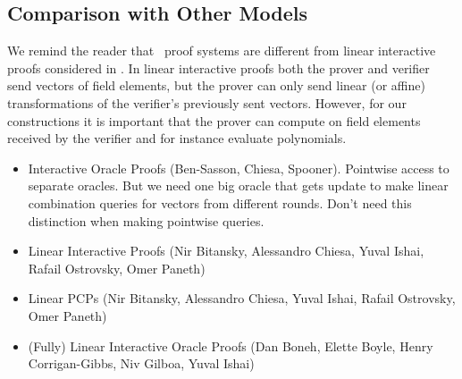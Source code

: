 \subsection{Comparison with Other Models}

We remind the reader that \ILC\ proof systems are different from linear interactive proofs considered in \cite{BitanskyCIPO13}. In linear interactive proofs both the prover and verifier send vectors of field elements, but the prover can only send linear (or affine) transformations of the verifier's previously sent vectors. However, for our constructions it is important that the prover can compute on field elements received by the verifier and for instance evaluate polynomials.

\begin{itemize}
\item Interactive Oracle Proofs (Ben-Sasson, Chiesa, Spooner). Pointwise access to separate oracles. But we need one big oracle that gets update to make linear combination queries for vectors from different rounds. Don't need this distinction when making pointwise queries.
\item Linear Interactive Proofs (Nir Bitansky, Alessandro Chiesa, Yuval Ishai, Rafail Ostrovsky, Omer Paneth)
\item Linear PCPs (Nir Bitansky, Alessandro Chiesa, Yuval Ishai, Rafail Ostrovsky, Omer Paneth)
\item (Fully) Linear Interactive Oracle Proofs (Dan Boneh, Elette Boyle, Henry Corrigan-Gibbs, Niv Gilboa, Yuval Ishai)
\end{itemize}